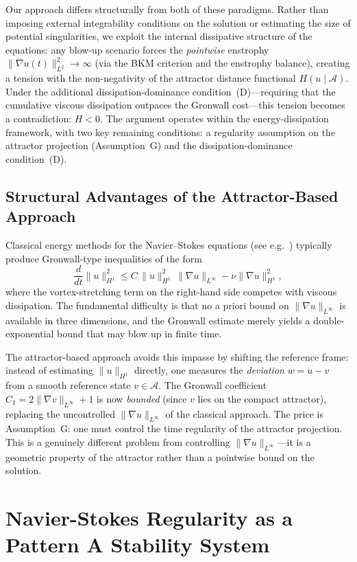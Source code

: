 \documentclass[12pt,a4paper]{article}
\theoremstyle{definition}
\theoremstyle{plain}
\theoremstyle{remark}
\begin{document}
Our approach differs structurally from both of these paradigms. Rather than imposing external integrability conditions on the solution or estimating the size of potential singularities, we exploit the internal dissipative structure of the equations: any blow-up scenario forces the \emph{pointwise} enstrophy $\|\nabla u(t)\|_{L^2}^2 \to \infty$ (via the BKM criterion and the enstrophy balance), creating a tension with the non-negativity of the attractor distance functional $H(u \mid \mathcal{A})$. Under the additional dissipation-dominance condition~(D)---requiring that the cumulative viscous dissipation outpaces the Gronwall cost---this tension becomes a contradiction: $H < 0$. The argument operates within the energy-dissipation framework, with two key remaining conditions: a regularity assumption on the attractor projection (Assumption~G) and the dissipation-dominance condition~(D).

\subsection{Structural Advantages of the Attractor-Based Approach}

Classical energy methods for the Navier--Stokes equations (see e.g.\ \cite{ConstantinFoias1988,Temam2001}) typically produce Gronwall-type inequalities of the form
\[
    \frac{d}{dt}\|u\|_{H^1}^2 \le C\,\|u\|_{H^1}^2\,\|\nabla u\|_{L^\infty} - \nu\|\nabla u\|_{H^1}^2,
\]
where the vortex-stretching term on the right-hand side competes with viscous dissipation. The fundamental difficulty is that no a priori bound on $\|\nabla u\|_{L^\infty}$ is available in three dimensions, and the Gronwall estimate merely yields a double-exponential bound that may blow up in finite time.

The attractor-based approach avoids this impasse by shifting the reference frame: instead of estimating $\|u\|_{H^1}$ directly, one measures the \emph{deviation} $w = u - v$ from a smooth reference state $v \in \mathcal{A}$. The Gronwall coefficient $C_1 = 2\|\nabla v\|_{L^\infty} + 1$ is now \emph{bounded} (since $v$ lies on the compact attractor), replacing the uncontrolled $\|\nabla u\|_{L^\infty}$ of the classical approach. The price is Assumption~G: one must control the time regularity of the attractor projection. This is a genuinely different problem from controlling $\|\nabla u\|_{L^\infty}$---it is a geometric property of the attractor rather than a pointwise bound on the solution.

\section{Navier-Stokes Regularity as a Pattern A Stability System}
\end{document}
